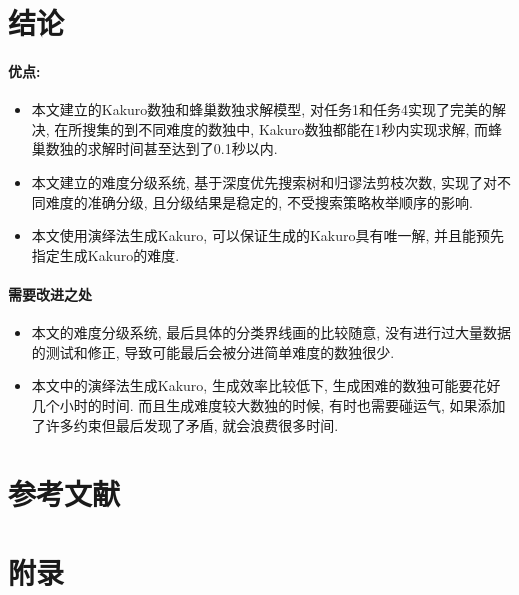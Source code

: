 \section{结论}
    \paragraph{优点:}
        \begin{itemize}
            \item
                本文建立的Kakuro数独和蜂巢数独求解模型, 对任务1和任务4实现了完美的解决,
                在所搜集的到不同难度的数独中, Kakuro数独都能在1秒内实现求解,
                而蜂巢数独的求解时间甚至达到了0.1秒以内.
            \item
                本文建立的难度分级系统, 基于深度优先搜索树和归谬法剪枝次数,
                实现了对不同难度的准确分级,
                且分级结果是稳定的, 不受搜索策略枚举顺序的影响.
            \item
                本文使用演绎法生成Kakuro, 可以保证生成的Kakuro具有唯一解,
                并且能预先指定生成Kakuro的难度.
        \end{itemize}
    \paragraph{需要改进之处}
        \begin{itemize}
            \item
                本文的难度分级系统, 最后具体的分类界线画的比较随意,
                没有进行过大量数据的测试和修正, 导致可能最后会被分进简单难度的数独很少.
            \item
                本文中的演绎法生成Kakuro, 生成效率比较低下, 生成困难的数独可能要花好几个小时的时间.
                而且生成难度较大数独的时候, 有时也需要碰运气, 如果添加了许多约束但最后发现了矛盾,
                就会浪费很多时间.
        \end{itemize}
    \newpage

\section*{参考文献}
    
    

    \newpage

\section*{附录}
